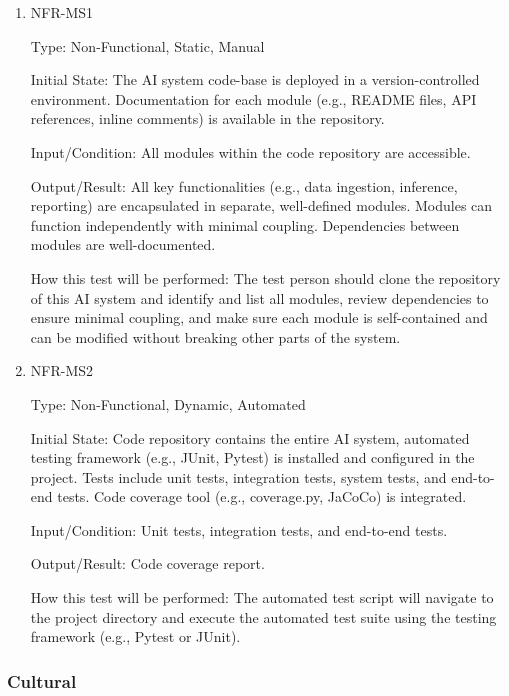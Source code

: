 \documentclass[12pt, titlepage]{article}
\begin{document}
\begin{enumerate}

\item{NFR-MS1\\}\label{NFR-MS1}

Type: Non-Functional, Static, Manual

Initial State: The AI system code-base is deployed in a version-controlled environment. Documentation for each module (e.g., README files, API references, inline comments) is available in the repository.

Input/Condition: All modules within the code repository are accessible.

Output/Result: All key functionalities (e.g., data ingestion, inference, reporting) are encapsulated in separate, well-defined modules. Modules can function independently with minimal coupling. Dependencies between modules are well-documented.

How this test will be performed: The test person should clone the repository of this AI system and identify and list all modules, review dependencies to ensure minimal coupling, and make sure each module is self-contained and can be modified without breaking other parts of the system.

\item{NFR-MS2\\}\label{NFR-MS2}

Type: Non-Functional, Dynamic, Automated

Initial State: Code repository contains the entire AI system, automated testing framework (e.g., JUnit, Pytest) is installed and configured in the project. Tests include unit tests, integration tests, system tests, and end-to-end tests. Code coverage tool (e.g., coverage.py, JaCoCo) is integrated.

Input/Condition: Unit tests, integration tests, and end-to-end tests.

Output/Result: Code coverage report.

How this test will be performed: The automated test script will navigate to the project directory and execute the automated test suite using the testing framework (e.g., Pytest or JUnit).

\end{enumerate}

\subsubsection{Cultural}
\end{document}
